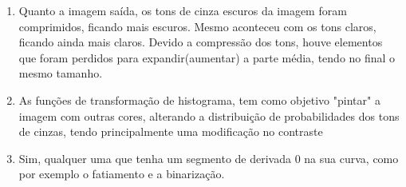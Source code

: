 \begin{question}

    \begin{enumerate}[label=\textbf{\alph*})]
		\item Quanto a imagem saída, os tons de cinza escuros da 
		imagem foram comprimidos, ficando mais escuros. Mesmo aconteceu com 
		os tons claros, ficando ainda mais claros. Devido a compressão 
		dos tons, houve elementos que foram perdidos para 
		expandir(aumentar) a parte média, tendo no final o mesmo tamanho.
  		\item As funções de transformação de histograma, tem como objetivo 
		"pintar" a imagem com outras cores, alterando a distribuição de probabilidades 
		dos tons de cinzas, tendo principalmente uma modificação no contraste
    	\item Sim, qualquer uma que tenha um segmento de derivada 0 na sua curva,
		como por exemplo o fatiamento e a binarização.
	\end{enumerate}

\end{question}